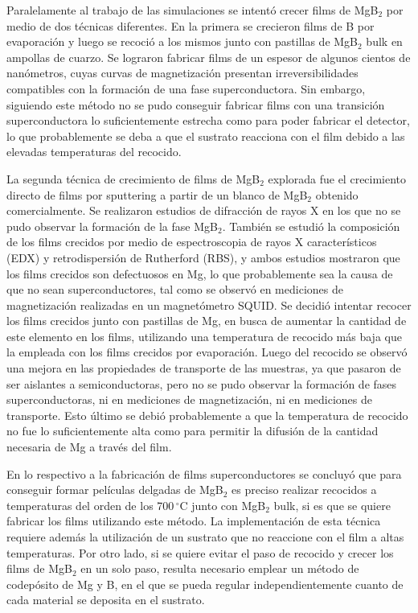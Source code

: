 Paralelamente al trabajo de las simulaciones se intentó crecer films de MgB$_2$ por medio de dos técnicas diferentes. En la primera se crecieron films de B por evaporación y luego se recoció a los mismos junto con pastillas de MgB$_2$ bulk en ampollas de cuarzo. Se lograron fabricar films de un espesor de algunos cientos de nanómetros, cuyas curvas de magnetización presentan irreversibilidades compatibles con la formación de una fase superconductora. Sin embargo, siguiendo este método no se pudo conseguir fabricar films con una transición superconductora lo suficientemente estrecha como para poder fabricar el detector, lo que probablemente se deba a que el sustrato reacciona con el film debido a las elevadas temperaturas del recocido.

La segunda técnica de crecimiento de films de MgB$_2$ explorada fue el crecimiento directo de films por sputtering a partir de un blanco de MgB$_2$ obtenido comercialmente. Se realizaron estudios de difracción de rayos X en los que no se pudo observar la formación de la fase MgB$_2$. También se estudió la composición de los films crecidos por medio de espectroscopia de rayos X característicos (EDX) y retrodispersión de Rutherford (RBS), y ambos estudios mostraron que los films crecidos son defectuosos en Mg, lo que probablemente sea la causa de que no sean superconductores, tal como se observó en mediciones de magnetización realizadas en un magnetómetro SQUID. Se decidió intentar recocer los films crecidos junto con pastillas de Mg, en busca de aumentar la cantidad de este elemento en los films, utilizando una temperatura de recocido más baja que la empleada con los films crecidos por e\-va\-po\-ra\-ción. Luego del recocido se observó una mejora en las propiedades de transporte de las muestras, ya que pasaron de ser aislantes a semiconductoras, pero no se pudo observar la formación de fases superconductoras, ni en mediciones de magnetización, ni en mediciones de transporte. Esto último se debió probablemente a que la temperatura de recocido no fue lo suficientemente alta como para permitir la difusión de la cantidad necesaria de Mg a través del film.

En lo respectivo a la fabricación de films superconductores se concluyó que para conseguir formar películas delgadas de MgB$_2$ es preciso realizar recocidos a tem\-pe\-ra\-tu\-ras del orden de los 700\,$^{\circ}$C junto con MgB$_2$ bulk, si es que se quiere fabricar los films utilizando este método. La implementación de esta técnica requiere además la utilización de un sustrato que no reaccione con el film a altas temperaturas. Por otro lado, si se quiere evitar el paso de recocido y crecer los films de MgB$_2$ en un solo paso, resulta necesario emplear un método de codepósito de Mg y B, en el que se pueda regular independientemente cuanto de cada material se deposita en el sustrato.
